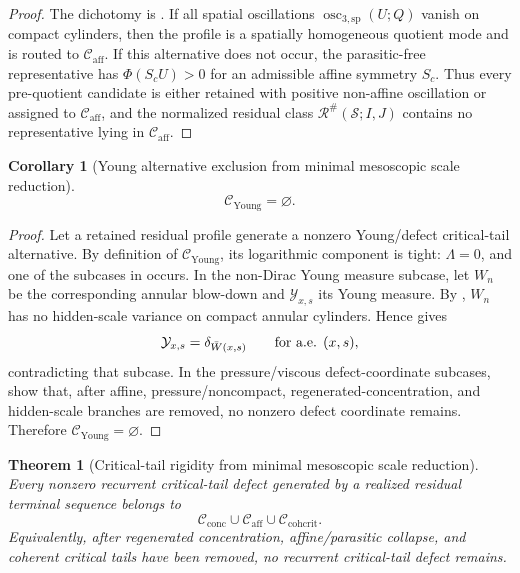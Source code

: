 \documentclass[11pt]{amsart}
\numberwithin{equation}{section}
\theoremstyle{plain}
\newtheorem{theorem}{Theorem}[section]
\newtheorem{corollary}[corollary]{Corollary}
\theoremstyle{definition}
\theoremstyle{remark}
\newcommand{\calS}{\mathcal S}
\newcommand{\calR}{\mathcal R}
\newcommand{\Cactive}{\mathcal C_{\mathrm{conc}}}
\newcommand{\Caff}{\mathcal C_{\mathrm{aff}}}
\newcommand{\Ccohcrit}{\mathcal C_{\mathrm{cohcrit}}}
\newcommand{\Cyoung}{\mathcal C_{\mathrm{Young}}}
\newcommand{\oscsp}{\operatorname{osc}_{3,\mathrm{sp}}}
\begin{document}
\begin{proof}
The dichotomy is .  If all
spatial oscillations \(\oscsp(U;Q)\) vanish on compact cylinders, then the profile
is a spatially homogeneous quotient mode and is routed to \(\Caff\).  If this
alternative does not occur, the parasitic-free representative has
\(\Phi(S_cU)>0\) for an admissible affine symmetry \(S_c\).  Thus every
pre-quotient candidate is either retained with positive non-affine oscillation
or assigned to \(\Caff\), and the normalized residual class
\(\calR^\#(\calS;I,J)\) contains no representative lying in \(\Caff\).
\end{proof}

\begin{corollary}[Young alternative exclusion from minimal mesoscopic scale reduction]
\label{cor:young-branch-exclusion}
\[
   \Cyoung=\varnothing .
\]
\end{corollary}

\begin{proof}
Let a retained residual profile generate a nonzero Young/defect critical-tail alternative.
By definition of \(\Cyoung\), its logarithmic component is tight:
\(\Lambda=0\), and one of the subcases in
 occurs.  In the non-Dirac Young
measure subcase, let \(W_n\) be the corresponding annular blow-down and
\(\mathcal Y_{x,s}\) its Young measure.  By
,
\(W_n\) has no hidden-scale variance on compact annular cylinders.  Hence
 gives
\[
   \mathcal Y_{x,s}=\delta_{\bar W(x,s)}
   \qquad\hbox{for a.e. }(x,s),
\]
contradicting that subcase.  In the pressure/viscous defect-coordinate subcases,
show that, after affine, pressure/noncompact, regenerated-concentration, and
hidden-scale branches are removed, no nonzero defect coordinate remains.
Therefore
\(\Cyoung=\varnothing\).
\end{proof}

\begin{theorem}[Critical-tail rigidity from minimal mesoscopic scale reduction]
\label{thm:remaining-rigidity-exact-form}
Every nonzero recurrent critical-tail defect generated by a realized residual
terminal sequence belongs to
\[
   \Cactive\cup\Caff\cup\Ccohcrit .
\]
Equivalently, after regenerated concentration, affine/parasitic collapse, and
coherent critical tails have been removed, no recurrent critical-tail defect
remains.
\end{theorem}
\end{document}
